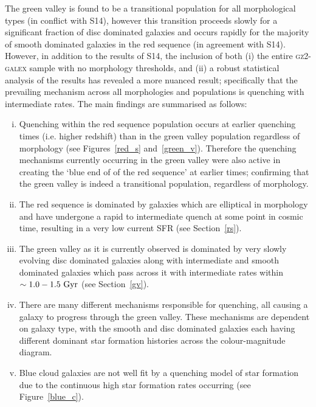 The green valley is found to be a transitional population for all morphological types (in conflict with S14), however this transition proceeds slowly for a significant fraction of disc dominated galaxies and occurs rapidly for the majority of smooth dominated galaxies in the red sequence (in agreement with S14). However, in addition to the results of S14, the inclusion of both (i) the entire \textsc{gz2-galex} sample with no morphology thresholds, and (ii) a robust statistical analysis of the results has revealed a more nuanced result; specifically that the prevailing mechanism across all morphologies and populations is quenching with intermediate rates. The main findings are summarised as follows:
\begin{enumerate}[(i)]
\item Quenching within the red sequence population occurs at earlier quenching times (i.e. higher redshift) than in the green valley population regardless of morphology (see Figures~\ref{red_s} and~\ref{green_v}). Therefore the quenching mechanisms currently occurring in the green valley were also active in creating the `blue end of of the red sequence' at earlier times; confirming that the green valley is indeed a transitional population, regardless of morphology.

\item The red sequence is dominated by galaxies which are elliptical in morphology and have undergone a rapid to intermediate quench at some point in cosmic time, resulting in a very low current SFR (see Section~\ref{rs}).

\item The green valley as it is currently observed is dominated by very slowly evolving disc dominated galaxies along with intermediate and smooth dominated galaxies which pass across it with intermediate rates within $\sim 1.0-1.5~\rm{Gyr}$ (see Section~\ref{gv}).

\item There are many different mechanisms responsible for quenching, all causing a galaxy to progress through the green valley. These mechanisms are dependent on galaxy type, with the smooth and disc dominated galaxies each having different dominant star formation histories across the colour-magnitude diagram. 

\item Blue cloud galaxies are not well fit by a quenching model of star formation due to the continuous high star formation rates occurring (see Figure~\ref{blue_c}).


\end{enumerate}
